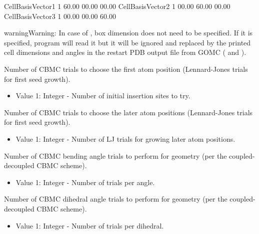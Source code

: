 \documentclass[letterpaper,10pt,english]{sphinxmanual}
\begin{document}
\begin{description}
\begin{sphinxVerbatim}[commandchars=\\\{\}]
CellBasisVector1 1 60.00 00.00 00.00
CellBasisVector2 1 00.00 60.00 00.00
CellBasisVector3 1 00.00 00.00 60.00
\end{sphinxVerbatim}

\begin{sphinxadmonition}{warning}{Warning:}
In case of , box dimension does not need to be specified. If it is specified, program will read it but it will be ignored and replaced by the printed cell dimensions and angles in the restart PDB output file from GOMC ( and ).
\end{sphinxadmonition}

\item[{\sphinxcode{\sphinxupquote{CBMC\_First}}}] \leavevmode
Number of CBMC trials to choose the first atom position (Lennard-Jones trials for first seed growth).
\begin{itemize}
\item {} 
Value 1: Integer - Number of initial insertion sites to try.

\end{itemize}

\item[{\sphinxcode{\sphinxupquote{CBMC\_Nth}}}] \leavevmode
Number of CBMC trials to choose the later atom positions (Lennard-Jones trials for first seed growth).
\begin{itemize}
\item {} 
Value 1: Integer - Number of LJ trials for growing later atom positions.

\end{itemize}

\item[{\sphinxcode{\sphinxupquote{CBMC\_Ang}}}] \leavevmode
Number of CBMC bending angle trials to perform for geometry (per the coupled-decoupled CBMC scheme).
\begin{itemize}
\item {} 
Value 1: Integer - Number of trials per angle.

\end{itemize}

\item[{\sphinxcode{\sphinxupquote{CBMC\_Dih}}}] \leavevmode
Number of CBMC dihedral angle trials to perform for geometry (per the coupled-decoupled CBMC scheme).
\begin{itemize}
\item {} 
Value 1: Integer - Number of trials per dihedral.


\end{itemize}
\end{description}
\end{document}
